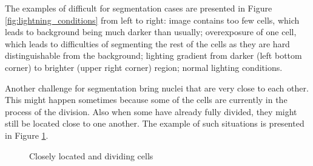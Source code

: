 The examples of difficult for segmentation cases are presented in Figure \ref{fig:lightning_conditions} from left to right: image contains too few cells, which leads to background being much darker than usually; overexposure of one cell, which leads to difficulties of segmenting the rest of the cells as they are hard distinguishable from the background; lighting gradient from darker (left bottom corner) to brighter (upper right corner) region; normal lighting conditions.

Another challenge for segmentation bring nuclei that are very close to each other. This might happen sometimes because some of the cells are currently in the process of the division. Also when some have already fully divided, they might still be located close to one another. The example of such situations is presented in Figure \ref{fig:closely-located-cells}.

\begin{figure}[H]
    \centering
    \qquad
    \caption{Closely located and dividing cells}
    \label{fig:closely-located-cells}
\end{figure}

